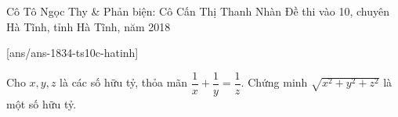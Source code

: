 \begin{name}
{Cô  Tô Ngọc Thy \& Phản biện: Cô Cấn Thị Thanh Nhàn }
{Đề thi vào 10, chuyên Hà Tĩnh, tỉnh Hà Tĩnh, năm 2018}
\end{name}
\setcounter{ex}{0}
[ans/ans-1834-ts10c-hatinh]
\begin{ex}%
	Cho $x, y, z$ là các số hữu tỷ, thỏa mãn $\dfrac{1}{x} + \dfrac{1}{y} = \dfrac{1}{z}$.
	Chứng minh $\sqrt {{x^2} + {y^2} + {z^2}}$ là một số hữu tỷ.
\end{ex}
